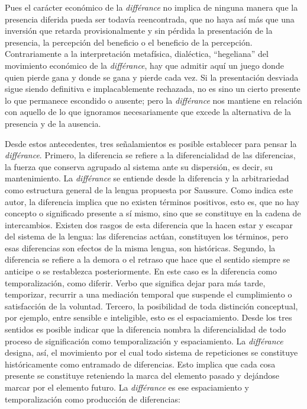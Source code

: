 Pues el carácter económico de la \emph{différance} no implica de ninguna manera que la presencia diferida pueda ser todavía reencontrada, que no haya así más que una inversión que retarda provisionalmente y sin pérdida la presentación de la presencia, la percepción del beneficio o el beneficio de la percepción. Contrariamente a la interpretación metafísica, dialéctica, ``hegeliana'' del movimiento económico de la \emph{différance}, hay que admitir aquí un juego donde quien pierde gana y donde se gana y pierde cada vez. Si la presentación desviada sigue siendo definitiva e implacablemente rechazada, no es sino un cierto presente lo que permanece escondido o ausente; pero la \emph{différance} nos mantiene en relación con aquello de lo que ignoramos necesariamente que excede la alternativa de la presencia y de la ausencia.

Desde estos antecedentes, tres señalamientos es posible establecer para pensar la \emph{différance}. Primero, la diferencia se refiere a la diferencialidad de las diferencias, la fuerza que conserva agrupado al sistema ante su dispersión, es decir, su mantenimiento. La \emph{différance} se entiende desde la diferencia y la arbitrariedad como estructura general de la lengua propuesta por Saussure. Como indica este autor, la diferencia implica que no existen términos positivos, esto es, que no hay concepto o significado presente a sí mismo, sino que se constituye en la cadena de intercambios. Existen dos rasgos de esta diferencia que la hacen estar y escapar del sistema de la lengua: las diferencias actúan, constituyen los términos, pero esas diferencias son efectos de la misma lengua, son históricas. Segundo, la diferencia se refiere a la demora o el retraso que hace que el sentido siempre se anticipe o se restablezca posteriormente. En este caso es la diferencia como temporalización, como diferir. Verbo que significa dejar para más tarde, temporizar, recurrir a una mediación temporal que suspende el cumplimiento o satisfacción de la voluntad. Tercero, la posibilidad de toda distinción conceptual, por ejemplo, entre sensible e inteligible, esto es el espaciamiento. Desde los tres sentidos es posible indicar que la diferencia nombra la diferencialidad de todo proceso de significación como temporalización y espaciamiento. La \emph{différance} designa, así, el movimiento por el cual todo sistema de repeticiones se constituye históricamente como entramado de diferencias. Esto implica que cada cosa presente se constituye reteniendo la marca del elemento pasado y dejándose marcar por el elemento futuro. La \emph{différance} es ese espaciamiento y temporalización como producción de diferencias:

